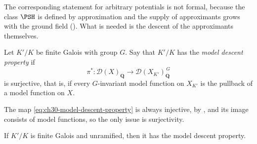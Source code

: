 The corresponding statement for arbitrary potentials is not formal, because
the class \(\PSH\) is defined by approximation and the supply of
approximants grows with the ground field
().  What is needed is the descent of the
approximants themselves.

\begin{definition}
\label{def:ch30-model-descent-property}
Let \(K'/K\) be finite Galois with group \(G\).  Say that \(K'/K\) has the
\emph{model descent property} if
\begin{equation}
\label{eq:ch30-model-descent-property}
 \pi^*:\mathcal D(X)_{\mathbf Q}
 \longrightarrow
 \mathcal D(X_{K'})_{\mathbf Q}^{\,G}
\end{equation}
is surjective, that is, if every \(G\)-invariant model function on
\(X_{K'}\) is the pullback of a model function on \(X\).
\end{definition}

The map \eqref{eq:ch30-model-descent-property} is always injective, by
, and its image consists of model
functions, so the only issue is surjectivity.

\begin{theorem}
\label{thm:ch30-model-descent}
If \(K'/K\) is finite Galois and unramified, then it has the model descent
property.
\end{theorem}

